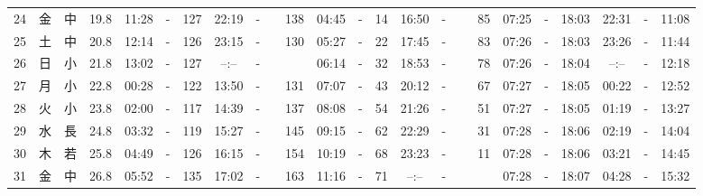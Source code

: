 \documentclass[12pt,a4j]{jsarticle}
\begin{document}
\begin{table}[htbp]
\begin{center}
{\begin{tabular}{|rc|cr|ccrccr|ccrccr|ccc|ccc|}
24 & 金 & 中 & 19.8 &  11:28 &-& 127 &  22:19 &-& 138 &  04:45 &-&  14 &  16:50 &-&  85 & 07:25 & -& 18:03 & 22:31 & -& 11:08 \\
25 & 土 & 中 & 20.8 &  12:14 &-& 126 &  23:15 &-& 130 &  05:27 &-&  22 &  17:45 &-&  83 & 07:26 & -& 18:03 & 23:26 & -& 11:44 \\
26 & 日 & 小 & 21.8 &  13:02 &-& 127 &  --:-- &-&~~~~~ &  06:14 &-&  32 &  18:53 &-&  78 & 07:26 & -& 18:04 & --:-- & -& 12:18 \\
27 & 月 & 小 & 22.8 &  00:28 &-& 122 &  13:50 &-& 131 &  07:07 &-&  43 &  20:12 &-&  67 & 07:27 & -& 18:05 & 00:22 & -& 12:52 \\
28 & 火 & 小 & 23.8 &  02:00 &-& 117 &  14:39 &-& 137 &  08:08 &-&  54 &  21:26 &-&  51 & 07:27 & -& 18:05 & 01:19 & -& 13:27 \\
29 & 水 & 長 & 24.8 &  03:32 &-& 119 &  15:27 &-& 145 &  09:15 &-&  62 &  22:29 &-&  31 & 07:28 & -& 18:06 & 02:19 & -& 14:04 \\
30 & 木 & 若 & 25.8 &  04:49 &-& 126 &  16:15 &-& 154 &  10:19 &-&  68 &  23:23 &-&  11 & 07:28 & -& 18:06 & 03:21 & -& 14:45 \\
31 & 金 & 中 & 26.8 &  05:52 &-& 135 &  17:02 &-& 163 &  11:16 &-&  71 &  --:-- &-&~~~~~ & 07:28 & -& 18:07 & 04:28 & -& 15:32 \\
   \hline
   \end{tabular}}
   \end{center}
\end{table}
\newpage
\end{document}

